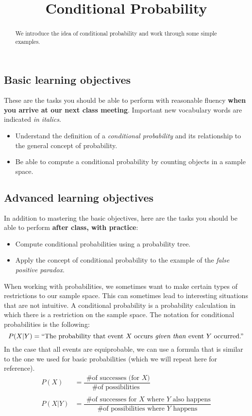\documentclass{ximera}
\title{Conditional Probability}
\begin{document}
\begin{abstract}
We introduce the idea of conditional probability and work through some simple examples.
\end{abstract}
\maketitle

\subsection*{Basic learning objectives}

These are the tasks you should be able to perform with reasonable fluency \textbf{when you arrive at our next class meeting}. Important new vocabulary words are indicated \emph{in italics}. 

\begin{itemize}
	\item Understand the definition of a \emph{conditional probability} and its relationship to the general concept of probability.
    \item Be able to compute a conditional probability by counting objects in a sample space.
\end{itemize}

\subsection*{Advanced learning objectives}

In addition to mastering the basic objectives, here are the tasks you should be able to perform \textbf{after class, with practice}: 

\begin{itemize}
    \item Compute conditional probabilities using a probability tree.
    \item Apply the concept of conditional probability to the example of the \emph{false positive paradox}.
\end{itemize}

\noindent\hrulefill

When working with probabilities, we sometimes want to make certain types of restrictions to our sample space. This can sometimes lead to interesting situations that are not intuitive. A conditional probability is a probability calculation in which there is a restriction on the sample space. The notation for conditional probabilities is the following:
\[ P(X | Y) = \text{``The probability that event $X$ occurs \emph{given than} event $Y$ occurred.''} \]
In the case that all events are equiprobable, we can use a formula that is similar to the one we used for basic probabilities (which we will repeat here for reference).
\begin{align*}
  P(X) & = \dfrac{ \text{ \# of successes (for $X$)}}{ \text{\# of possibilities } } \\ \\
  P(X | Y) & = \dfrac{ \text{ \# of successes for $X$ where $Y$ also happens}}{ \text{\# of possibilities where $Y$ happens}}
\end{align*}
\end{document}
